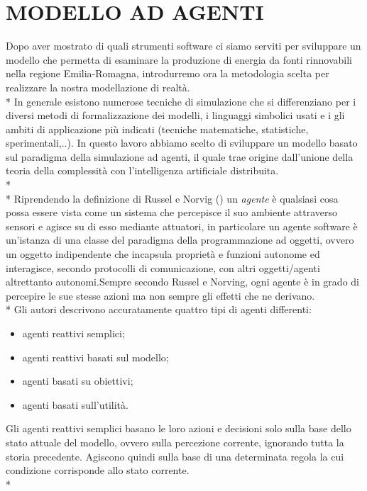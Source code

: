 \documentclass[12pt,a4paper,openright,twoside]{report}
\begin{document}
\section{MODELLO AD AGENTI}

Dopo aver mostrato di quali strumenti software ci siamo serviti per sviluppare un modello che permetta di esaminare la produzione di energia da fonti rinnovabili nella regione Emilia-Romagna, introdurremo ora la metodologia scelta per realizzare la nostra modellazione di realtà.\\*
In generale esistono numerose tecniche di simulazione che si differenziano per i diversi metodi di formalizzazione dei modelli, i linguaggi simbolici usati e i gli ambiti di applicazione più indicati (tecniche matematiche, statistiche, sperimentali,..). In questo lavoro abbiamo scelto di sviluppare un modello basato sul paradigma della simulazione ad agenti, il quale trae origine dall'unione della teoria della complessità con l'intelligenza artificiale distribuita.\\*\\*
Riprendendo la definizione di Russel e Norvig (\cite{Russell}) un \emph{agente} è qualsiasi cosa possa essere vista come un sistema che percepisce il suo ambiente attraverso sensori e agisce su di esso mediante attuatori, in particolare un agente software è un'istanza di una classe del paradigma della programmazione ad oggetti, ovvero un oggetto indipendente  che incapsula proprietà e funzioni autonome ed interagisce, secondo protocolli di comunicazione, con altri oggetti/agenti altrettanto autonomi.Sempre secondo Russel e Norving, ogni agente è in grado di percepire le sue stesse azioni ma non sempre gli effetti che ne derivano.\\* Gli autori descrivono accuratamente quattro tipi di agenti differenti:
\begin{itemize}
\item agenti reattivi semplici;
\item agenti reattivi basati sul modello;
\item agenti basati su obiettivi;
\item agenti basati sull'utilità.
\end{itemize}
Gli agenti reattivi semplici basano le loro azioni e decisioni solo sulla base dello stato attuale del modello, ovvero sulla percezione corrente, ignorando tutta la storia precedente. Agiscono quindi sulla base di una determinata regola la cui condizione corrisponde allo stato corrente.\\*
\end{document}
